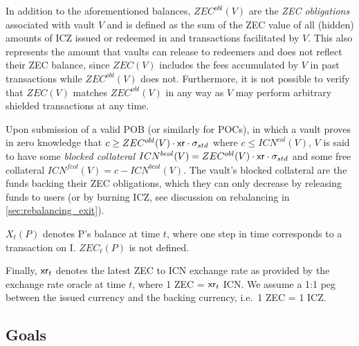 In addition to the aforementioned balances, $ZEC^{obl}(V)$ are the \emph{ZEC obligations} associated with vault $V$ and is defined as the sum of the ZEC value of all (hidden) amounts of ICZ issued or redeemed in \mint and \burn transactions facilitated by $V$.
This also represents the amount that vaults can release to redeemers and does not reflect their ZEC balance, since $ZEC(V)$ includes the fees accumulated by $V$ in past transactions while $ZEC^{obl}(V)$ does not.
Furthermore, it is not possible to verify that $ZEC(V)$ matches $ZEC^{obl}(V)$ in any way as $V$ may perform arbitrary shielded transactions at any time.

Upon submission of a valid POB (or similarly for POCs), in which a vault proves in zero knowledge that $c \geq ZEC^{obl}(V) \cdot \mathsf{xr} \cdot \sigma_{std}$ where $c \leq ICN^{col}(V)$, $V$ is said to have some \emph{blocked collateral} $ICN^{bcol}(V) = ZEC^{obl}(V) \cdot \mathsf{xr} \cdot \sigma_{std}$ and some free collateral $ICN^{fcol}(V) = c - ICN^{bcol}(V)$.
The vault's blocked collateral are the funds backing their ZEC obligations, which they can only decrease by releasing funds to users (or by burning ICZ, see discussion on rebalancing in \cref{sec:rebalancing_exit}).

$X_t(P)$ denotes P's balance at time $t$, where one step in time corresponds to a transaction on I.
$ZEC_t(P)$ is not defined.

Finally, $\mathsf{xr}_t$ denotes the latest ZEC to ICN exchange rate as provided by the exchange rate oracle \oxr at time $t$, where 1 ZEC = $\mathsf{xr}_t$ ICN.
We assume a 1:1 peg between the issued currency and the backing currency, i.e.\ 1 ZEC = 1 ICZ.

\subsection{Goals}
\label{sec:security_goals}


